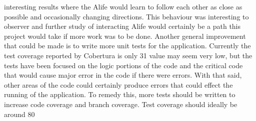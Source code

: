 \documentclass[12pt]{article}
\begin{document}
interesting results where the Alife would learn to follow each other as close as possible and occasionally changing directions. This behaviour was
interesting to observer and further study of interacting Alife would certainly be a path this project would take if more work was to be done.
Another general improvement that could be made is to write more unit tests for the application. Currently the test coverage reported by Cobertura is only 31%
value may seem very low, but the tests have been focused on the logic portions of the code and the critical code that would cause major error in the code if there 
were errors. With that said, other areas of the code could certainly produce errors that could effect the running of the application. To remedy this, more tests
should be written to increase code coverage and branch coverage. Test coverage should ideally be around 80%






\end{document}
